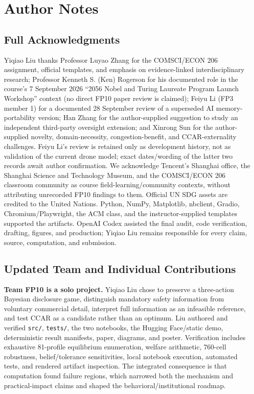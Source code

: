 \clearpage\nobalance
\section*{Author Notes}
\subsection*{Full Acknowledgments}
Yiqiao Liu thanks Professor Luyao Zhang for the COMSCI/ECON 206 assignment, official templates, and emphasis on evidence-linked interdisciplinary research; Professor Kenneth S. (Ken) Rogerson for his documented role in the course's 7 September 2026 “2056 Nobel and Turing Laureate Program Launch Workshop” context (no direct FP10 paper review is claimed); Feiyu Li (FP3 member 1) for a documented 28 September review of a superseded AI memory-portability version; Han Zhang for the author-supplied suggestion to study an independent third-party oversight extension; and Xinrong Sun for the author-supplied novelty, domain-necessity, congestion-benefit, and CCAR-externality challenges. Feiyu Li's review is retained only as development history, not as validation of the current drone model; exact dates/wording of the latter two records await author confirmation. We acknowledge Tencent's Shanghai office, the Shanghai Science and Technology Museum, and the COMSCI/ECON 206 classroom community as course field-learning/community contexts, without attributing unrecorded FP10 findings to them. Official UN SDG assets are credited to the United Nations. Python, NumPy, Matplotlib, nbclient, Gradio, Chromium/Playwright, the ACM class, and the instructor-supplied templates supported the artifacts. OpenAI Codex assisted the final audit, code verification, drafting, figures, and production; Yiqiao Liu remains responsible for every claim, source, computation, and submission.

\subsection*{Updated Team and Individual Contributions}
\textbf{Team FP10 is a solo project.} Yiqiao Liu chose to preserve a three-action Bayesian disclosure game, distinguish mandatory safety information from voluntary commercial detail, interpret full information as an infeasible reference, and test CCAR as a candidate rather than an optimum. Liu authored and verified \texttt{src/}, \texttt{tests/}, the two notebooks, the Hugging Face/static demo, deterministic result manifests, paper, diagrams, and poster. Verification includes exhaustive 81-profile equilibrium enumeration, welfare arithmetic, 760-cell robustness, belief/tolerance sensitivities, local notebook execution, automated tests, and rendered artifact inspection. The integrated consequence is that computation found failure regions, which narrowed both the mechanism and practical-impact claims and shaped the behavioral/institutional roadmap.

